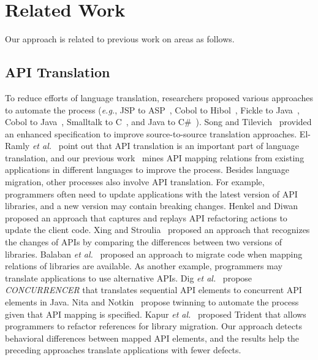 \section{Related Work}
\label{sec:related}

Our approach is related to previous work on areas as follows.

\subsection{API Translation} To reduce efforts of language translation, researchers proposed various
approaches to automate the process (\emph{e.g.}, JSP to ASP~\citep{hassan2005lightweight}, Cobol to Hibol~\citep{waters1988program}, Fickle to Java~\citep{ancona2007provenly}, Cobol to Java~\citep{mossienko2003automated}, Smalltalk to C~\citep{yasumatsu1995spice}, and Java to C\#~\citep{el2006experiment}). Song and Tilevich~\citep{song2009enhancing} provided an enhanced specification to improve source-to-source translation approaches. El-Ramly \emph{et al.}~\citep{el2006experiment} point out that API translation is an important part of language translation, and our previous work~\citep{zhong2010mining} mines API mapping relations from existing applications in different languages to improve the process. Besides language migration, other processes also involve API translation. For example, programmers often need to update applications with the latest version of API libraries, and a new version may contain breaking changes. Henkel and Diwan~\citep{henkel2005catchup} proposed an approach that captures and replays API refactoring actions to update the client code. Xing and Stroulia~\citep{xing2007api} proposed an approach that recognizes the changes of APIs by comparing the differences between two versions of libraries. Balaban \emph{et al.}~\citep{balaban2005refactoring} proposed an approach to migrate code when mapping relations of libraries are available. As another example, programmers may translate applications to use alternative APIs. Dig \emph{et al.}~\citep{dig2009refactoring} propose \emph{CONCURRENCER} that translates sequential API elements to concurrent API elements in Java. Nita and Notkin~\citep{nita2010using} propose twinning to automate the process given that API mapping is specified. Kapur \emph{et al.}~\citep{kapur2010refactoring} proposed Trident that allows programmers to refactor references for library migration. Our approach detects behavioral differences between mapped API elements, and the results help the preceding approaches translate applications with fewer defects.

